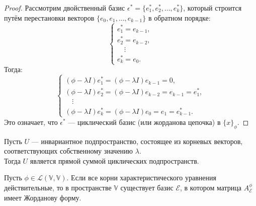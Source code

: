 \begin{proof}
    Рассмотрим двойственный базис \( \epsilon^* = \{e_1^*, e_2^*, \ldots, e_k^*\} \), который строится путём перестановки векторов \( \{e_0, e_1, \ldots, e_{k-1}\} \) в обратном порядке:
    \[
    \begin{cases}
        e_1^* = e_{k-1}, \\
        e_2^* = e_{k-2}, \\
        \quad \vdots \\
        e_k^* = e_0.
    \end{cases}
    \]
    Тогда:
    \[
    \begin{cases}
        (\phi - \lambda I) e_1^* = (\phi - \lambda I) e_{k-1} = 0, \\
        (\phi - \lambda I) e_2^* = (\phi - \lambda I) e_{k-2} = e_{k-1} = e_1^*, \\
        \quad \vdots \\
        (\phi - \lambda I) e_k^* = (\phi - \lambda I) e_0 = e_1 = e_{k-1}^*.
    \end{cases}
    \]
    Это означает, что \( \epsilon^* \) — циклический базис (или жорданова цепочка) в \( \{x\}_{\phi} \).
\end{proof}

\vspace{0.2cm}

\begin{shth}
    \begin{theorem}
        \leavevmode \nl 
        
        Пусть \( U \) — инвариантное подпространство, состоящее из корневых векторов, \\соответствующих собственному значению \( \lambda \). \\Тогда \( U \) является прямой суммой циклических подпространств.
    \end{theorem}
\end{shth}

\begin{shth}
    \begin{theorem}
        \leavevmode \nl 
        
        Пусть \( \phi \in \mathcal{L}(\mathbb{V}, \mathbb{V}) \). Если все корни характеристического уравнения действительные, то в пространстве \( \mathbb{V} \) существует базис \( \mathcal{E} \), в котором матрица \( A_{\mathcal{E}}^{\phi} \) имеет Жорданову форму.
    \end{theorem}
\end{shth}

